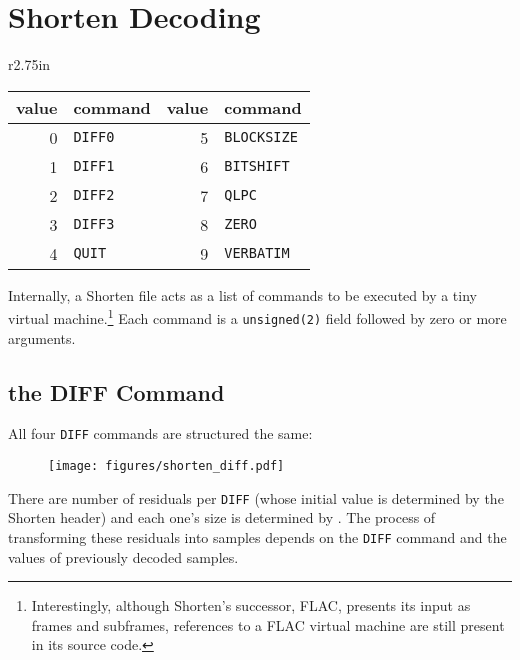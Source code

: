 \section{Shorten Decoding}
\begin{wrapfigure}[4]{r}{2.75in}
\begin{tabular}{|r|l||r|l|}
\hline
value & command & value & command \\
\hline
0 & \texttt{DIFF0} & 5 & \texttt{BLOCKSIZE} \\
1 & \texttt{DIFF1} & 6 & \texttt{BITSHIFT} \\
2 & \texttt{DIFF2} & 7 & \texttt{QLPC} \\
3 & \texttt{DIFF3} & 8 & \texttt{ZERO} \\
4 & \texttt{QUIT} & 9 & \texttt{VERBATIM} \\
\hline
\end{tabular}
\end{wrapfigure}
Internally,
a Shorten file acts as a list of commands to be executed by a tiny
virtual machine.\footnote{Interestingly, although
Shorten's successor, FLAC, presents its input as frames and subframes,
references to a FLAC virtual machine are still present in its source code.}
Each command is a \texttt{unsigned(2)} field followed by zero or more
arguments.

\subsection{the DIFF Command}
All four \texttt{DIFF} commands are structured the same:
\begin{figure}[h]
\texttt{[image: figures/shorten\_diff.pdf]}
\end{figure}
\par
\noindent
There are  number of residuals per \texttt{DIFF}
(whose initial value is determined by the Shorten header)
and each one's size is determined by .
The process of transforming these residuals into samples
depends on the \texttt{DIFF} command and the values of
previously decoded samples.

